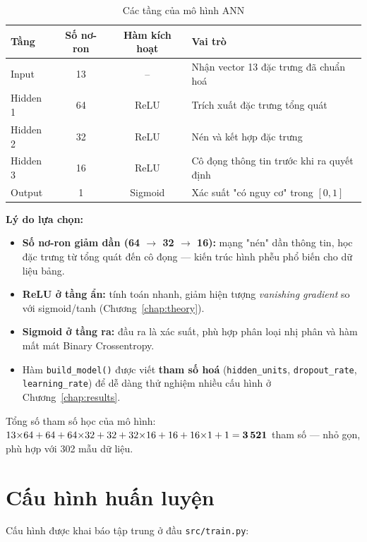 \begin{table}[h]
\centering
\caption{Các tầng của mô hình ANN}
\label{tab:layers}
\begin{tabular}{lccl}
\toprule
Tầng & Số nơ-ron & Hàm kích hoạt & Vai trò \\
\midrule
Input    & 13 & --      & Nhận vector 13 đặc trưng đã chuẩn hoá \\
Hidden 1 & 64 & ReLU    & Trích xuất đặc trưng tổng quát \\
Hidden 2 & 32 & ReLU    & Nén và kết hợp đặc trưng \\
Hidden 3 & 16 & ReLU    & Cô đọng thông tin trước khi ra quyết định \\
Output   & 1  & Sigmoid & Xác suất "có nguy cơ" trong $[0,1]$ \\
\bottomrule
\end{tabular}
\end{table}

\textbf{Lý do lựa chọn:}
\begin{itemize}
  \item \textbf{Số nơ-ron giảm dần (64 $\to$ 32 $\to$ 16):} mạng "nén" dần
        thông tin, học đặc trưng từ tổng quát đến cô đọng --- kiến trúc hình
        phễu phổ biến cho dữ liệu bảng.
  \item \textbf{ReLU ở tầng ẩn:} tính toán nhanh, giảm hiện tượng
        \emph{vanishing gradient} so với sigmoid/tanh (Chương~\ref{chap:theory}).
  \item \textbf{Sigmoid ở tầng ra:} đầu ra là xác suất, phù hợp phân loại nhị
        phân và hàm mất mát Binary Crossentropy.
  \item Hàm \texttt{build\_model()} được viết \textbf{tham số hoá}
        (\texttt{hidden\_units}, \texttt{dropout\_rate},
        \texttt{learning\_rate}) để dễ dàng thử nghiệm nhiều cấu hình ở
        Chương~\ref{chap:results}.
\end{itemize}

Tổng số tham số học của mô hình:
$13{\times}64 + 64 + 64{\times}32 + 32 + 32{\times}16 + 16 + 16{\times}1 + 1
= \textbf{3\,521}$ tham số --- nhỏ gọn, phù hợp với 302 mẫu dữ liệu.

\section{Cấu hình huấn luyện}
Cấu hình được khai báo tập trung ở đầu \texttt{src/train.py}:

